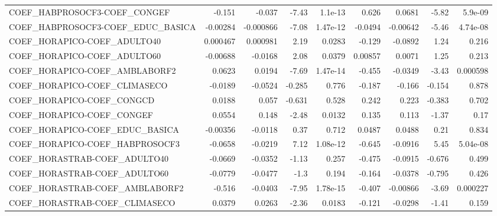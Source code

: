 \begin{tabular}{lrrrrrrrr}
COEF\_HABPROSOCF3-COEF\_CONGEF           &      -0.151 &       -0.037 &    -7.43 &  1.1e-13 &      0.626 &      0.0681 &        -5.82 &       5.9e-09 \\
COEF\_HABPROSOCF3-COEF\_EDUC\_BASICA      &    -0.00284 &    -0.000866 &    -7.08 & 1.47e-12 &    -0.0494 &    -0.00642 &        -5.46 &      4.74e-08 \\
COEF\_HORAPICO-COEF\_ADULTO40            &    0.000467 &     0.000981 &     2.19 &   0.0283 &     -0.129 &     -0.0892 &         1.24 &         0.216 \\
COEF\_HORAPICO-COEF\_ADULTO60            &    -0.00688 &      -0.0168 &     2.08 &   0.0379 &    0.00857 &      0.0071 &         1.25 &         0.213 \\
COEF\_HORAPICO-COEF\_AMBLABORF2          &      0.0623 &       0.0194 &    -7.69 & 1.47e-14 &     -0.455 &     -0.0349 &        -3.43 &      0.000598 \\
COEF\_HORAPICO-COEF\_CLIMASECO           &     -0.0189 &      -0.0524 &   -0.285 &    0.776 &     -0.187 &      -0.166 &       -0.154 &         0.878 \\
COEF\_HORAPICO-COEF\_CONGCD              &      0.0188 &        0.057 &   -0.631 &    0.528 &      0.242 &       0.223 &       -0.383 &         0.702 \\
COEF\_HORAPICO-COEF\_CONGEF              &      0.0554 &        0.148 &    -2.48 &   0.0132 &      0.135 &       0.113 &        -1.37 &          0.17 \\
COEF\_HORAPICO-COEF\_EDUC\_BASICA         &    -0.00356 &      -0.0118 &     0.37 &    0.712 &     0.0487 &      0.0488 &         0.21 &         0.834 \\
COEF\_HORAPICO-COEF\_HABPROSOCF3         &     -0.0658 &      -0.0219 &     7.12 & 1.08e-12 &     -0.645 &     -0.0916 &         5.45 &      5.04e-08 \\
COEF\_HORASTRAB-COEF\_ADULTO40           &     -0.0669 &      -0.0352 &    -1.13 &    0.257 &     -0.475 &     -0.0915 &       -0.676 &         0.499 \\
COEF\_HORASTRAB-COEF\_ADULTO60           &     -0.0779 &      -0.0477 &     -1.3 &    0.194 &     -0.164 &     -0.0378 &       -0.795 &         0.426 \\
COEF\_HORASTRAB-COEF\_AMBLABORF2         &      -0.516 &      -0.0403 &    -7.95 & 1.78e-15 &     -0.407 &    -0.00866 &        -3.69 &      0.000227 \\
COEF\_HORASTRAB-COEF\_CLIMASECO          &      0.0379 &       0.0263 &    -2.36 &   0.0183 &     -0.121 &     -0.0298 &        -1.41 &         0.159 \\

\end{tabular}
